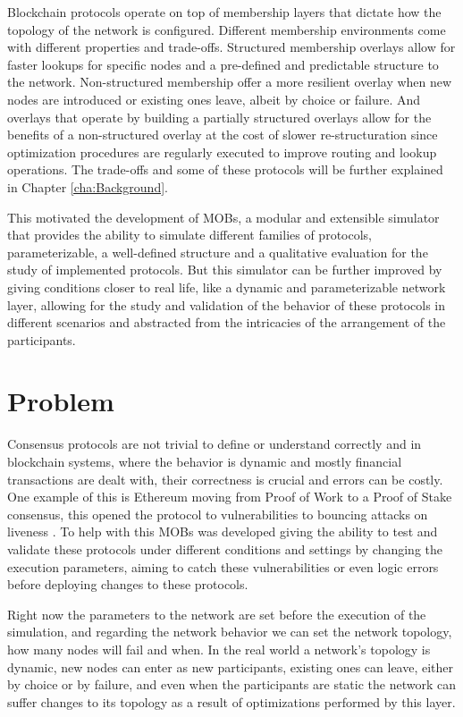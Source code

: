 Blockchain protocols operate on top of membership layers that dictate how the topology of the network is configured.
Different membership environments come with different properties and trade-offs. Structured membership overlays allow for faster lookups for
specific nodes and a pre-defined and predictable structure to the network. Non-structured membership offer a more resilient overlay when
new nodes are introduced or existing ones leave, albeit by choice or failure. And overlays that operate by building a partially structured
overlays allow for the benefits of a non-structured overlay at the cost of slower re-structuration since optimization
procedures are regularly executed to improve routing and lookup operations. The trade-offs and some of these protocols will be further
explained in Chapter \ref{cha:Background}.

This motivated the development of MOBs, a modular and extensible simulator that provides the ability to simulate different families of protocols, 
parameterizable, a well-defined structure and a qualitative evaluation for the study of implemented protocols. But this simulator can be further 
improved by giving conditions closer to real life, like a dynamic and parameterizable network layer, allowing for the study and validation of the
behavior of these protocols in different scenarios and abstracted from the intricacies of the arrangement of the participants.

\section{Problem}
\label{sub:problem}
Consensus protocols are not trivial to define or understand correctly and in blockchain systems, where the behavior is dynamic and mostly 
financial transactions are dealt with, their correctness is crucial and errors can be costly. One example of this is Ethereum moving from 
Proof of Work to a Proof of Stake consensus, this opened the protocol to vulnerabilities to bouncing attacks on liveness \cite{ethereum_analysis}. 
To help with this MOBs was developed giving the ability to test and validate these protocols under different conditions and settings by 
changing the execution parameters, aiming to catch these vulnerabilities or even logic errors before deploying changes to these protocols.

Right now the parameters to the network are set before the execution of the simulation, and regarding the network behavior we can
set the network topology, how many nodes will fail and when. In the real world a network's topology is dynamic, new nodes can enter
as new participants, existing ones can leave, either by choice or by failure, and even when the participants are static the network
can suffer changes to its topology as a result of optimizations performed by this layer.

